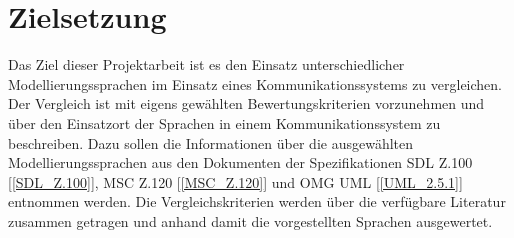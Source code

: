 \section{Zielsetzung}
\label{sc:Zielsetzung}
Das Ziel dieser Projektarbeit ist es den Einsatz unterschiedlicher Modellierungssprachen im Einsatz eines Kommunikationssystems zu vergleichen. Der Vergleich ist mit eigens gewählten Bewertungskriterien vorzunehmen und über den Einsatzort der Sprachen in einem Kommunikationssystem zu beschreiben. Dazu sollen die Informationen über die ausgewählten Modellierungssprachen aus den Dokumenten der Spezifikationen \acs{SDL} Z.100 [\ref{SDL_Z.100}], \acs{MSC} Z.120 [\ref{MSC_Z.120}] und OMG \acs{UML} [\ref{UML_2.5.1}] entnommen werden. Die Vergleichskriterien werden über die verfügbare Literatur zusammen getragen und anhand damit die vorgestellten Sprachen ausgewertet.
